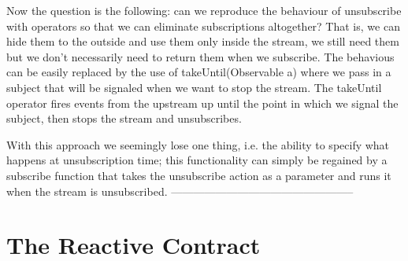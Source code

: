 Now the question is the following: can we reproduce the behaviour of unsubscribe with operators so that we can eliminate subscriptions altogether? That is, we can hide them to the outside and use them only inside the stream, we still need them but we don't necessarily need to return them when we subscribe. The behavious can be easily replaced by the use of takeUntil(Observable a) where we pass in a subject that will be signaled when we want to stop the stream. The takeUntil operator fires events from the upstream up until the point in which we signal the subject, then stops the stream and unsubscribes. 

With this approach we seemingly lose one thing, i.e. the ability to specify what happens at unsubscription time; this functionality can simply be regained by a subscribe function that takes the unsubscribe action as a parameter and runs it when the stream is unsubscribed.
--------------------------------------------------

\section{The Reactive Contract}